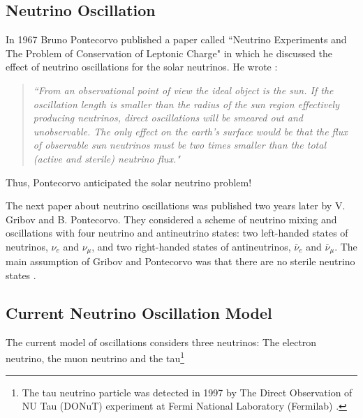 \subsection{Neutrino Oscillation}

In 1967 Bruno Pontecorvo published a paper called ``Neutrino Experiments and The Problem of Conservation of Leptonic Charge" in which he discussed the effect of neutrino oscillations for the solar neutrinos. He wrote \cite{pontecorvo_1967}: 
\begin{quote}
\emph{``From an observational point of view the ideal object is the sun. If the oscillation length is smaller than the radius of the sun region effectively producing neutrinos, direct oscillations will be smeared out and unobservable. The only effect on the earth’s surface would be that the flux of observable sun neutrinos must be two times smaller than the total (active and sterile) neutrino flux."}
\end{quote}
%
Thus, Pontecorvo anticipated the solar neutrino problem! 

The next paper about neutrino oscillations was published two years later by V. Gribov and B. Pontecorvo. They considered a scheme of neutrino mixing and oscillations with four neutrino and antineutrino states: two left-handed states of neutrinos, $\nu_e$ and $\nu_\mu$, and two right-handed states of antineutrinos,  $\overline{\nu}_e$ and $\overline{\nu}_\mu$. The main assumption of Gribov and Pontecorvo was that there are no sterile neutrino states \cite{neutrino_oscillations_brief_history_and_present_status}.

\subsection{Current Neutrino Oscillation Model}

The current model of oscillations considers three neutrinos: The electron neutrino, the muon neutrino and the tau\footnote{The tau neutrino particle was detected in 1997 by The Direct Observation of NU Tau (DONuT) experiment at Fermi National Laboratory (Fermilab) \cite{tau_neutrino_discovery}.} 

